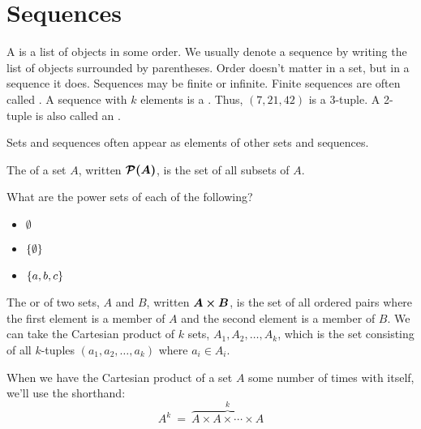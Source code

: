 \section{Sequences}

\begin{defn}\label{defn:sequence}\label{defn:tuple}
A  is a list of objects in some order. We usually denote a sequence by writing the list of objects surrounded by parentheses. Order doesn't matter in a set, but in a sequence it does. Sequences may be finite or infinite. Finite sequences are often called . A sequence with $k$ elements is a . Thus, $(7, 21, 42)$ is a 3-tuple. A 2-tuple is also called an .
\end{defn}

\begin{discussion}
Sets and sequences often appear as elements of other sets and sequences. 
\end{discussion}

\begin{defn}
The  of a set $A$, written $\bm{\mathcal{P}(A)}$, is the set of all subsets of $A$.
\end{defn}

\begin{exer}
What are the power sets of each of the following?
\begin{itemize}
\item $\emptyset$
\item $\left\lbrace \emptyset \right\rbrace$
\item $\left\lbrace a, b, c \right\rbrace$
\end{itemize}
\end{exer}

\begin{defn}
The  or  of two sets, $A$ and $B$, written $\bm{A \times B}$, is the set of all ordered pairs where the first element is a member of $A$ and the second element is a member of $B$. We can take the Cartesian product of $k$ sets, $A_1, A_2, \ldots, A_k$, which is the set consisting of all $k$-tuples $(a_1, a_2, \ldots, a_k)$ where $a_i \in A_i$.

When we have the Cartesian product of a set $A$ some number of times with itself, we'll use the shorthand:
\[
A^k \ =\  \overbrace{A \times A \times \cdots \times A}^k
\]

\end{defn}


